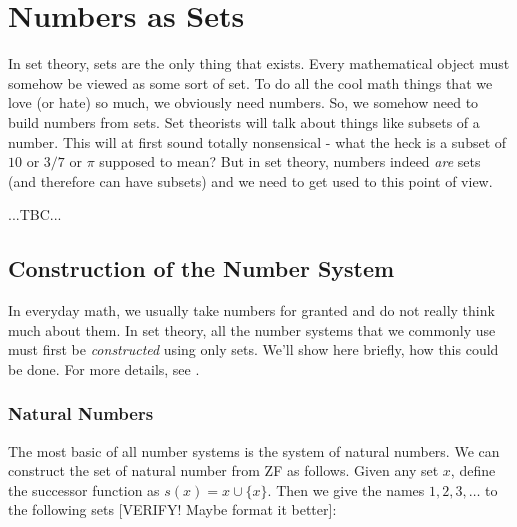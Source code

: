 
\section{Numbers as Sets}
In set theory, sets are the only thing that exists. Every mathematical object must somehow be viewed as some sort of set. To do all the cool math things that we love (or hate) so much, we obviously need numbers. So, we somehow need to build numbers from sets. Set theorists will talk about things like subsets of a number. This will at first sound totally nonsensical - what the heck is a subset of $10$ or $3/7$ or $\pi$ supposed to mean? But in set theory, numbers indeed \emph{are} sets (and therefore can have subsets) and we need to get used to this point of view.

% 

...TBC... 



\subsection{Construction of the Number System}
In everyday math, we usually take numbers for granted and do not really think much about them. In set theory, all the number systems that we commonly use must first be \emph{constructed} using only sets. We'll show here briefly, how this could be done. For more details, see \cite{PDF_MathFAQ}.


\subsubsection{Natural Numbers}
The most basic of all number systems is the system of natural numbers. We can construct the set of natural number from ZF as follows. Given any set $x$, define the successor function as $s(x) = x \cup \{ x \}$. Then we give the names $1,2,3,\ldots$ to the following sets [VERIFY! Maybe format it better]: 

